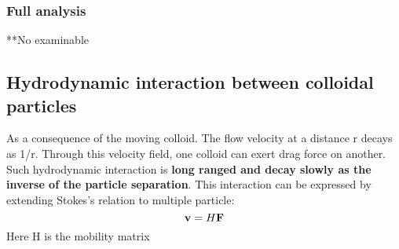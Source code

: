 \documentclass[12pt,a4paper]{article}
\begin{document}
            \subsubsection{Full analysis}
            **No examinable
        \subsection{Hydrodynamic interaction between colloidal particles}
            As a consequence of the moving colloid. The flow velocity at a distance r decays as 1/r. Through this velocity field, one colloid can exert drag force on another. Such hydrodynamic interaction is \textbf{long ranged and decay slowly as the inverse of the particle separation}.
            This interaction can be expressed by extending Stokes's relation to multiple particle:
            \begin{equation}
                \vb{v} = H \vb{F}
            \end{equation}
            Here H is the mobility matrix
\end{document}
